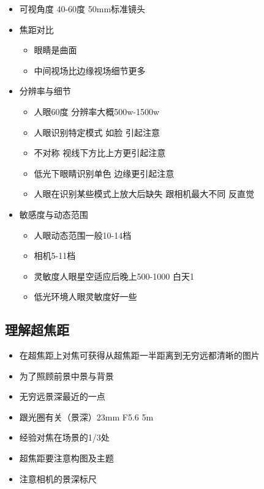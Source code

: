 \documentclass[
  letterpaper,
  DIV=11,
  numbers=noendperiod]{scrreprt}
\providecommand{\tightlist}{%
  \setlength{\itemsep}{0pt}\setlength{\parskip}{0pt}}\usepackage{longtable,booktabs,array}
\begin{document}
\begin{itemize}
\tightlist
\item
  可视角度 40-60度 50mm标准镜头
\item
  焦距对比

  \begin{itemize}
  \tightlist
  \item
    眼睛是曲面
  \item
    中间视场比边缘视场细节更多
  \end{itemize}
\item
  分辨率与细节

  \begin{itemize}
  \tightlist
  \item
    人眼60度 分辨率大概500w-1500w
  \item
    人眼识别特定模式 如脸 引起注意
  \item
    不对称 视线下方比上方更引起注意
  \item
    低光下眼睛识别单色 边缘更引起注意
  \item
    人眼在识别某些模式上放大后缺失 跟相机最大不同 反直觉
  \end{itemize}
\item
  敏感度与动态范围

  \begin{itemize}
  \tightlist
  \item
    人眼动态范围一般10-14档
  \item
    相机5-11档
  \item
    灵敏度人眼星空适应后晚上500-1000 白天1
  \item
    低光环境人眼灵敏度好一些
  \end{itemize}
\end{itemize}

\subsection{理解超焦距}\label{ux7406ux89e3ux8d85ux7126ux8ddd}

\begin{itemize}
\tightlist
\item
  在超焦距上对焦可获得从超焦距一半距离到无穷远都清晰的图片
\item
  为了照顾前景中景与背景
\item
  无穷远景深最近的一点
\item
  跟光圈有关（景深）23mm F5.6 5m
\item
  经验对焦在场景的1/3处
\item
  超焦距要注意构图及主题
\item
  注意相机的景深标尺
\end{itemize}
\end{document}
